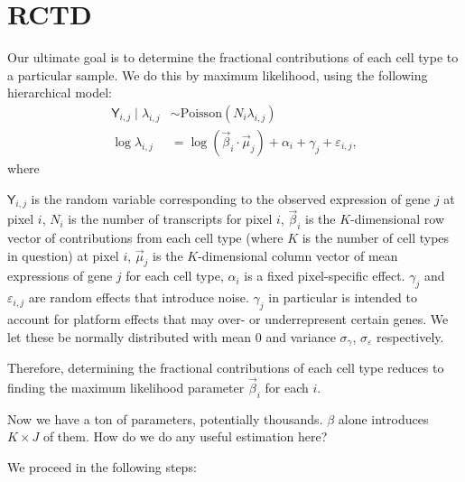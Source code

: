 \section{RCTD}

Our ultimate goal is to determine the fractional contributions of each cell type to a particular sample. We do this by maximum likelihood, using the following hierarchical model:
\begin{align*}
    \mathsf{Y}_{i, j} \mid \lambda_{i, j}
    &\sim \text{Poisson}(N_i \lambda_{i, j})
    \\
    \log \lambda_{i, j} &= \log (\vec{\beta}_i \cdot \vec{\mu}_{j}) + \alpha_i + \gamma_j + \varepsilon_{i, j},
\end{align*}
where
\begin{itemize}
    \ii $\mathsf{Y}_{i, j}$
    is the random variable corresponding to the observed expression of gene $j$ at pixel $i$,
    \ii $N_i$ is the number of transcripts for pixel $i$,
    \ii $\vec{\beta}_i$ is the $K$-dimensional row vector of contributions from each cell type (where $K$ is the number of cell types in question) at pixel $i$,
    \ii $\vec{\mu}_j$ is the $K$-dimensional column vector of mean expressions of gene $j$ for each cell type,
    \ii $\alpha_i$ is a fixed pixel-specific effect.
    \ii $\gamma_j$ and $\varepsilon_{i, j}$ are random effects that introduce noise. $\gamma_j$ in particular is intended to account for platform effects that may over- or underrepresent certain genes. We let these be normally distributed with mean 0 and variance $\sigma_\gamma$, $\sigma_\varepsilon$ respectively.
\end{itemize}
Therefore, determining the fractional contributions of each cell type reduces to finding the maximum likelihood parameter $\vec{\beta}_i$ for each $i$.
\begin{ques}
    Now we have a ton of parameters, potentially thousands. $\beta$ alone introduces $K\times J$ of them. How do we do any useful estimation here?
\end{ques}
We proceed in the following steps:
